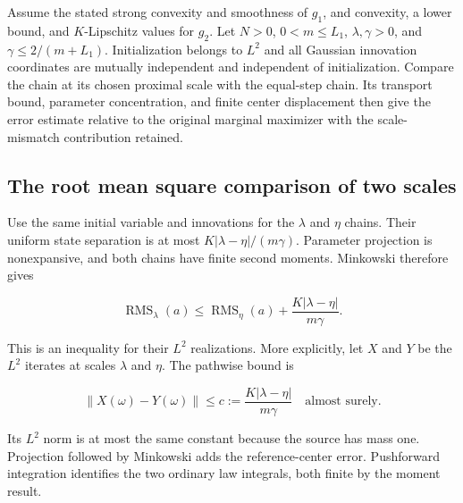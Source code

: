 \documentclass[11pt,a4paper]{report}
\begin{document}
Assume the stated strong convexity and smoothness of \(g_1\), and convexity, a lower bound, and \(K\)-Lipschitz values for \(g_2\). Let \(N>0\), \(0<m\le L_1\), \(\lambda,\gamma>0\), and \(\gamma\le2/(m+L_1)\). Initialization belongs to \(L^2\) and all Gaussian innovation coordinates are mutually independent and independent of initialization. Compare the chain at its chosen proximal scale with the equal-step chain. Its transport bound, parameter concentration, and finite center displacement then give the error estimate relative to the original marginal maximizer with the scale-mismatch contribution retained.

\subsection{\texorpdfstring{The root mean square comparison of two scales}{The root mean square comparison of two scales}}
\label{report-step-ProximalLangevin-SplittingTheorem-lean-1}


Use the same initial variable and innovations for the \(\lambda\) and \(\eta\) chains. Their uniform state separation is at most \(K|\lambda-\eta|/(m\gamma)\). Parameter projection is nonexpansive, and both chains have finite second moments. Minkowski therefore gives

\[\operatorname{RMS}_\lambda(a)\le\operatorname{RMS}_\eta(a)+\frac{K|\lambda-\eta|}{m\gamma}.\]

This is an inequality for their \(L^2\) realizations. More explicitly, let \(X\) and \(Y\) be the \(L^2\) iterates at scales \(\lambda\) and \(\eta\). The pathwise bound is

\[\|X(\omega)-Y(\omega)\|\le c:=\frac{K|\lambda-\eta|}{m\gamma}\quad\text{almost surely}.\]

Its \(L^2\) norm is at most the same constant because the source has mass one. Projection followed by Minkowski adds the reference-center error. Pushforward integration identifies the two ordinary law integrals, both finite by the moment result.
\end{document}
